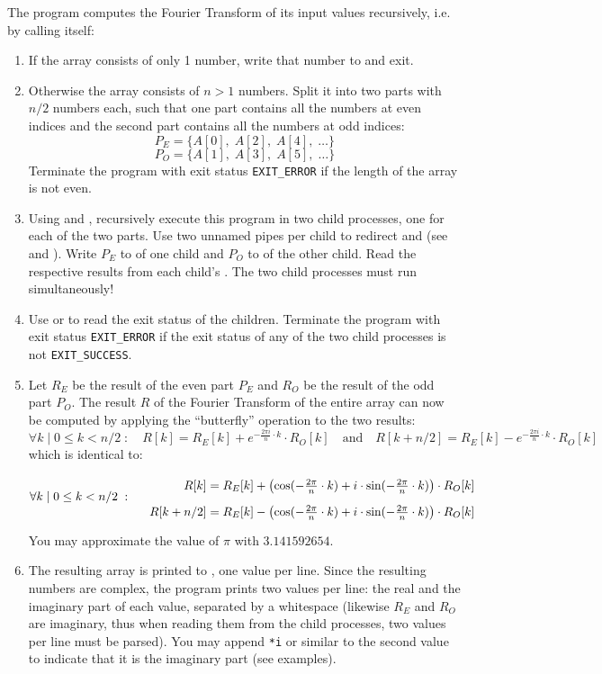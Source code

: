 The program computes the Fourier Transform of its input values recursively,
i.e. by calling itself:
\begin{enumerate}
\item If the array consists of only 1 number, write that number to  and exit.
\item Otherwise the array consists of $n>1$ numbers.
Split it into two parts with $n/2$ numbers each,
such that one part contains all the numbers at even indices
and the second part contains all the numbers at odd indices:
\[
P_E=\{A[0],\;A[2],\;A[4],\;\dots\}
\]
\[
P_O=\{A[1],\;A[3],\;A[5],\;\dots\}
\]
Terminate the program with exit status \verb|EXIT_ERROR|
if the length of the array is not even.

\item Using  and ,
recursively execute this program in two child processes,
one for each of the two parts.
Use two unnamed pipes per child
to redirect  and 
(see  and ).
Write $P_E$ to  of one child
and $P_O$ to  of the other child.
Read the respective results from each child's .
The two child processes must run simultaneously!

\item Use  or 
to read the exit status of the children.
Terminate the program with exit status \verb|EXIT_ERROR|
if the exit status of any of the two child processes is not \verb|EXIT_SUCCESS|.

\item Let $R_E$ be the result of the even part $P_E$
and $R_O$ be the result of the odd part $P_O$.
The result $R$ of the Fourier Transform of the entire array can now be computed
by applying the ``butterfly'' operation to the two results:
\[
\forall k\;|\;0\leq k<n/2\;:\quad R[k]=R_E[k]+e^{-\frac{2\pi i}{n}\cdot k}\cdot R_O[k]
\quad\text{and}\quad R[k+n/2]=R_E[k]-e^{-\frac{2\pi i}{n}\cdot k}\cdot R_O[k]
\]
which is identical to:
\[
\forall k\;|\;0\leq k<n/2\;:\quad
\renewcommand{\arraystretch}{1.8}
\begin{array}{r@{\;=\;}l}
 R[k]     & R_E[k]+\left(\text{cos}(-\frac{2\pi}{n}\cdot k)+i\cdot\text{sin}(-\frac{2\pi}{n}\cdot k)\right)\cdot R_O[k]\\
R[k+n/2] & R_E[k]-\left(\text{cos}(-\frac{2\pi}{n}\cdot k)+i\cdot\text{sin}(-\frac{2\pi}{n}\cdot k)\right)\cdot R_O[k]
\end{array}
\]
You may approximate the value of $\pi$ with $3.141592654$.
\item The resulting array is printed to , one value per line.
Since the resulting numbers are complex, the program prints two values per line:
the real and the imaginary part of each value, separated by a whitespace
(likewise $R_E$ and $R_O$ are imaginary,
thus when reading them from the child processes,
two values per line must be parsed).
You may append \verb|*i| or similar to the second value
to indicate that it is the imaginary part (see examples).

\end{enumerate}

